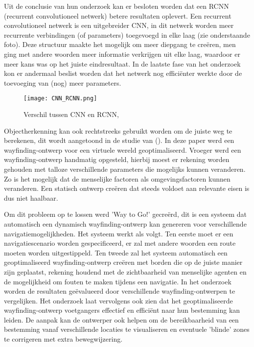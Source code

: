 Uit de conclusie van hun onderzoek kan er besloten worden dat een RCNN (recurrent convolutioneel netwerk) betere resultaten oplevert. Een recurrent convolutioneel netwerk is een uitgebreider CNN, in dit netwerk worden meer recurrente verbindingen (of parameters) toegevoegd in elke laag (zie onderstaande foto). Deze structuur maakte het mogelijk om meer diepgang te creëren, men ging met andere woorden meer informatie verkrijgen uit elke laag, waardoor er meer kans was op het juiste eindresultaat. In de laatste fase van het onderzoek kon er andermaal beslist worden dat het netwerk nog efficiënter werkte door de toevoeging van (nog) meer parameters.

\begin{figure}[H]
	\centering
	\texttt{[image: CNN\_RCNN.png]}
	\caption{Verschil tussen CNN en RCNN, \autocite{Liang2015}}
\end{figure}

Objectherkenning kan ook rechtstreeks gebruikt worden om de juiste weg te berekenen, dit wordt aangetoond in de studie van \textcite{Haikun2017} (). In deze paper werd een wayfinding-ontwerp voor een virtuele wereld geoptimaliseerd. Vroeger werd een wayfinding-ontwerp handmatig opgesteld, hierbij moest er rekening worden gehouden met talloze verschillende parameters die mogelijks kunnen veranderen. Zo is het mogelijk dat de menselijke factoren als omgevingsfactoren  kunnen veranderen. Een statisch ontwerp creëren dat steeds voldoet aan relevante eisen is dus niet haalbaar.

Om dit probleem op te lossen werd 'Way to Go!' gecreërd, dit is een systeem dat automatisch een dynamisch wayfinding-ontwerp kan genereren voor verschillende navigatiemogelijkheden. Het systeem werkt als volgt. Ten eerste moet er een navigatiescenario worden gespecificeerd, er zal  met andere woorden een route moeten worden uitgestippeld. Ten tweede zal het systeem automatisch een geoptimaliseerd wayfinding-ontwerp creëren met borden die op de juiste manier zijn geplaatst, rekening houdend met de zichtbaarheid van menselijke agenten en de mogelijkheid om fouten te maken tijdens een navigatie.  In het onderzoek worden de resultaten geëvalueerd door verschillende wayfinding-ontwerpen te vergelijken. Het onderzoek laat vervolgens ook zien dat het geoptimaliseerde wayfinding-ontwerp voetgangers effectief en efficiënt naar hun bestemming kan leiden. De aanpak kan de ontwerper ook helpen om de bereikbaarheid van een bestemming vanaf verschillende locaties te visualiseren en eventuele 'blinde' zones te corrigeren met extra bewegwijzering.

